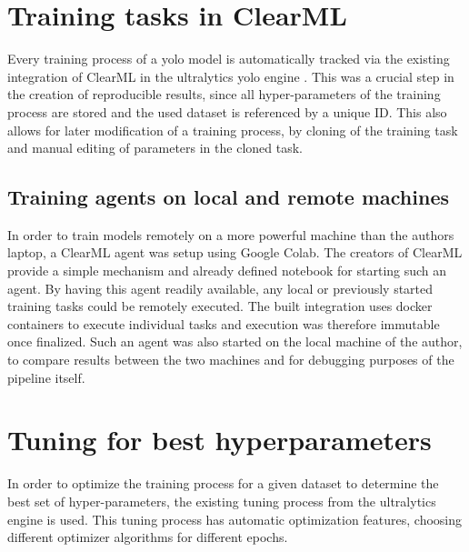 \documentclass[Bachelor, BIC, english, fhCitStyle, IEEE]{BASE/twbook} %
\begin{document}
\section{Training tasks in ClearML}
Every training process of a \ac{yolo} model is automatically tracked via the existing integration of ClearML in the ultralytics \ac{yolo} engine \autocite{ultralyticsClearML}. This was a crucial step in the creation of reproducible results, since all hyper-parameters of the training process are stored and the used dataset is referenced by a unique ID. This also allows for later modification of a training process, by cloning of the training task and manual editing of parameters in the cloned task.
\subsection{Training agents on local and remote machines}
In order to train models remotely on a more powerful machine than the authors laptop, a ClearML agent was setup using Google Colab. The creators of ClearML provide a simple mechanism and already defined notebook \autocite{ClearMLAgentGoogle} for starting such an agent. By having this agent readily available, any local or previously started training tasks could be remotely executed. The built integration uses docker containers to execute individual tasks and execution was therefore immutable once finalized. Such an agent was also started on the local machine of the author, to compare results between the two machines and for debugging purposes of the pipeline itself.
\section{Tuning for best hyperparameters}
In order to optimize the training process for a given dataset to determine the best set of hyper-parameters, the existing tuning process from the ultralytics engine \autocite{ultralyticsTuner} is used. This tuning process has automatic optimization features, choosing different optimizer algorithms for different epochs.
\end{document}
